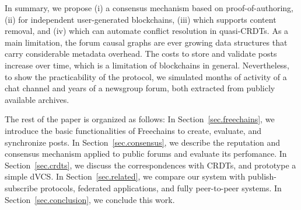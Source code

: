 \documentclass[10pt,journal,compsoc]{IEEEtran}
\newcommand{\FC}       {Freechains\xspace}
\begin{document}
In summary, we propose
    (i)   a consensus mechanism based on proof-of-authoring,
    (ii)  for independent user-generated blockchains,
    (iii) which supports content removal, and
    (iv)  which can automate conflict resolution in quasi-CRDTs.
%
As a main limitation, the forum causal graphs are ever growing data structures
that carry considerable metadata overhead.
The costs to store and validate posts increase over time, which is a limitation
of blockchains in general.
%
Nevertheless, to show the practicability of the protocol, we simulated months
of activity of a chat channel and years of a newsgroup forum, both extracted
from publicly available archives.

The rest of the paper is organized as follows:
In Section~\ref{sec.freechains}, we introduce the basic functionalities of \FC
to create, evaluate, and synchronize posts.
In Section~\ref{sec.consensus}, we describe the reputation and consensus
mechanism applied to public forums and evaluate its perfomance.
In Section~\ref{sec.crdts}, we discuss the correspondences with CRDTs, and
prototype a simple dVCS.
In Section~\ref{sec.related}, we compare our system with publish-subscribe
protocols, federated applications, and fully peer-to-peer systems.
In Section~\ref{sec.conclusion}, we conclude this work.
\end{document}
